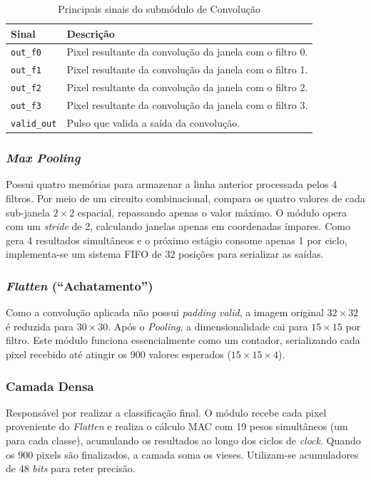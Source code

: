 \begin{table}[htbp]
\centering
\caption{Principais sinais do submódulo de Convolução}
\label{tab:sinais_convolucao}
\small
\begin{tabularx}{\textwidth}{l X}
\toprule
\textbf{Sinal} & \textbf{Descrição} \\
\midrule
\texttt{out\_f0} & Pixel resultante da convolução da janela com o filtro 0. \\
\texttt{out\_f1} & Pixel resultante da convolução da janela com o filtro 1. \\
\texttt{out\_f2} & Pixel resultante da convolução da janela com o filtro 2. \\
\texttt{out\_f3} & Pixel resultante da convolução da janela com o filtro 3. \\
\texttt{valid\_out} & Pulso que valida a saída da convolução. \\
\bottomrule
\end{tabularx}
\end{table}

\subsubsection{\textit{Max \textit{Pooling} }}
Possui quatro memórias para armazenar a linha anterior processada pelos 4 filtros. Por meio de um circuito combinacional, compara os quatro valores de cada sub-janela $2 \times 2$ espacial, repassando apenas o valor máximo. O módulo opera com um \textit{stride} de 2, calculando janelas apenas em coordenadas ímpares. Como gera 4 resultados simultâneos e o próximo estágio consome apenas 1 por ciclo, implementa-se um sistema FIFO de 32 posições para serializar as saídas.

\subsubsection{\textit{Flatten}  (``Achatamento'')}
Como a convolução aplicada não possui \textit{padding valid}, a imagem original $32 \times 32$ é reduzida para $30 \times 30$. Após o \textit{Pooling}, a dimensionalidade cai para $15 \times 15$ por filtro. Este módulo funciona essencialmente como um contador, serializando cada pixel recebido até atingir os 900 valores esperados ($15 \times 15 \times 4$).

\subsubsection{Camada Densa}
Responsável por realizar a classificação final. O módulo recebe cada pixel proveniente do \textit{Flatten}  e realiza o cálculo MAC com 19 pesos simultâneos (um para cada classe), acumulando os resultados ao longo dos ciclos de \textit{clock}. Quando os 900 pixels são finalizados, a camada soma os vieses. Utilizam-se acumuladores de 48 \textit{bits} para reter precisão.

